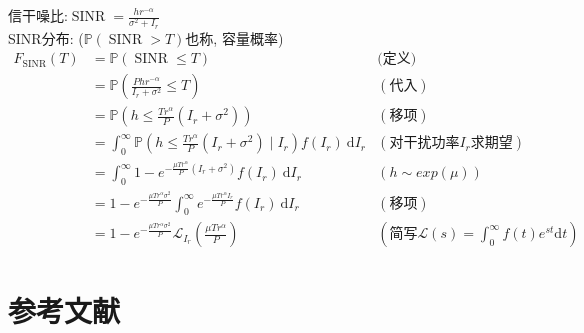 \documentclass{article}
\begin{document}
        信干噪比:\quad $\operatorname{SINR} = \frac{h r^{-\alpha}}{\sigma^2 + I_r}$\\
        SINR分布: ($\mathbb{P}\left(\operatorname{SINR} > T\right)$也称, 容量概率)
        \begin{align*}
            F_{\operatorname{SINR}}(T) 
            &= \mathbb{P}\left(\operatorname{SINR} \le T\right) & \text{(定义)}\\
            &= \mathbb{P}\left(\frac{P h r^{-\alpha}}{I_r +\sigma^{2}} \leq T\right) & (\text{代入}) \\
            &= \mathbb{P}\left(h \leq \frac{T r^\alpha}{P} (I_r + \sigma^2) \right) & (\text{移项}) \\
            &= \int_{0}^{\infty} \mathbb{P}\left(h \leq \frac{T r^\alpha}{P} (I_r + \sigma^2) \mid I_r \right) f(I_r) \mathrm{~d} I_r & (\text{对干扰功率$I_r$求期望}) \\
            &= \int_{0}^{\infty} 1 - e^{- \frac{\mu T r^\alpha}{P}(I_r + \sigma^2)}  f(I_r) \mathrm{~d} I_r & (h \sim exp(\mu))\\
            &= 1 - e^{- \frac{\mu T r^\alpha \sigma^2}{P}} \int_{0}^{\infty} e^{- \frac{\mu T r^\alpha I_r}{P}} f(I_r) \mathrm{~d} I_r & (\text{移项})\\
            &= 1 - e^{- \frac{\mu T r^\alpha \sigma^2}{P}} \mathcal{L}_{I_{r}}\left(\frac{\mu T r^{\alpha}}{P}\right) & (\text{简写}\mathcal{L}(s) = \int_0^{\infty} f(t) e^{st} \mathrm{d} t)
        \end{align*}
    

\section{参考文献}
    
\end{document}
